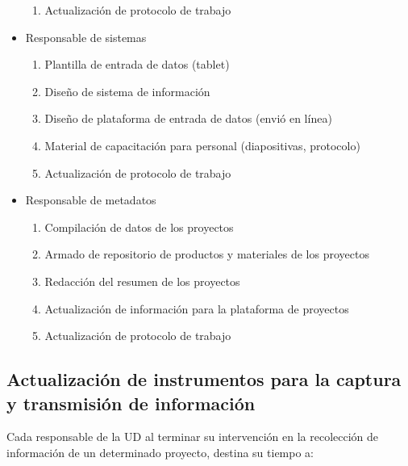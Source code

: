 \documentclass{article}
\begin{document}
\begin{itemize}
\begin{enumerate}
\item Actualización de protocolo de trabajo
\end{enumerate}
\item Responsable de sistemas
\begin{enumerate}
\item Plantilla de entrada de datos (tablet)
\item Diseño de sistema de información
\item Diseño de plataforma de entrada de datos (envió en línea)
\item Material de capacitación para personal (diapositivas, protocolo)
\item Actualización de protocolo de trabajo
\end{enumerate}
\item Responsable de metadatos
\begin{enumerate}
\item Compilación de datos de los proyectos
\item Armado de repositorio de productos y materiales de los proyectos
\item Redacción del resumen de los proyectos
\item Actualización de información para la plataforma de  proyectos
\item Actualización de protocolo de trabajo
\end{enumerate}
\end{itemize}



\subsection{Actualización de instrumentos para la captura y transmisión de información}

Cada responsable de la UD al terminar su intervención en la recolección de información de un determinado proyecto, destina su tiempo a:
\end{document}
